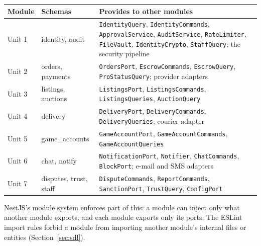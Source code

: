 \documentclass[11pt,a4paper]{article}
\newenvironment{dtable}[1]{\small\begin{longtable}{#1}}{\end{longtable}}
\begin{document}
\begin{dtable}{@{}>{\raggedright\arraybackslash}p{2.6cm}>{\ttfamily\raggedright\arraybackslash}p{3.4cm}>{\raggedright\arraybackslash}p{9.2cm}@{}}
\toprule
\textbf{Module} & \textnormal{\textbf{Schemas}} & \textbf{Provides to other modules} \\ \midrule \endhead
Unit 1 & identity, audit & \texttt{IdentityQuery}, \texttt{IdentityCommands}, \texttt{ApprovalService}, \texttt{AuditService}, \texttt{RateLimiter}, \texttt{FileVault}, \texttt{IdentityCrypto}, \texttt{StaffQuery}; the security pipeline \\
Unit 2 & orders, payments & \texttt{OrdersPort}, \texttt{EscrowCommands}, \texttt{EscrowQuery}, \texttt{ProStatusQuery}; provider adapters \\
Unit 3 & listings, auctions & \texttt{ListingsPort}, \texttt{ListingsCommands}, \texttt{ListingsQueries}, \texttt{AuctionQuery} \\
Unit 4 & delivery & \texttt{DeliveryPort}, \texttt{DeliveryCommands}, \texttt{DeliveryQueries}; courier adapter \\
Unit 5 & game\_accounts & \texttt{GameAccountPort}, \texttt{GameAccountCommands}, \texttt{GameAccountQueries} \\
Unit 6 & chat, notify & \texttt{NotificationPort}, \texttt{Notifier}, \texttt{ChatCommands}, \texttt{BlockPort}; e-mail and SMS adapters \\
Unit 7 & disputes, trust, staff & \texttt{DisputeCommands}, \texttt{ReportCommands}, \texttt{SanctionPort}, \texttt{TrustQuery}, \texttt{ConfigPort} \\
\bottomrule
\end{dtable}
NestJS's module system enforces part of this: a module can inject only what another module exports, and each module exports only its ports. The ESLint import rules forbid a module from importing another module's internal files or entities (Section~\ref{sec:sdl}).
\end{document}
